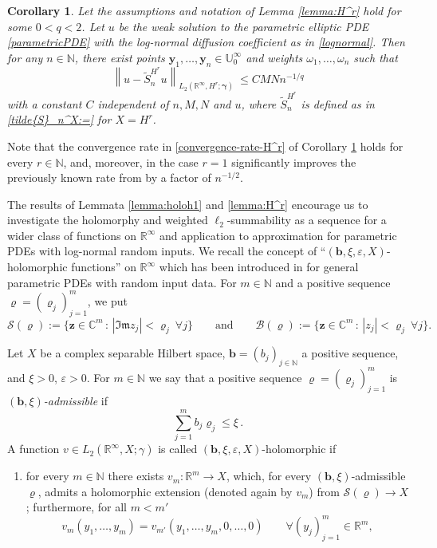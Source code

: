 \documentclass[11pt]{article}
\newtheorem{corollary}{Corollary}[section]
\numberwithin{equation}{section}
\theoremstyle{definition}
\theoremstyle{remark}
\newcommand{\set}[2]{\{#1\,:\,#2\}}
\newcommand{\norm}[2]{\left\|{#1}\right\|_{#2}}
\newcommand{\bb}{{\boldsymbol{b}}}
\newcommand{\by}{{\boldsymbol{y}}}
\newcommand{\bz}{{\boldsymbol{z}}}
\newcommand{\bgamma}{{\boldsymbol{\gamma}}}
\newcommand{\bvarrho}{{\boldsymbol{\varrho}}}
\def\RR{{\mathbb R}}
\def\NN{{\mathbb N}}
\def\CC{{\mathbb C}}
\def\CC{{\mathbb C}}
\def\NN{{\mathbb N}}
\def\RR{{\mathbb R}}
\def\Bb{{\mathcal B}}
\def\RRi{{\mathbb R}^\infty}
\def\UUi{{\mathbb U}^{\infty}}
\def\Bb{{\mathcal B}}
\def\Ss{{\mathcal S}}
\def\CC{{\mathbb C}}
\def\NN{{\mathbb N}}
\begin{document}
{\begin{corollary}\label{corollary:sampling-lognormal}
	Let the assumptions and notation of Lemma \ref{lemma:H^r} hold  for some
	$0 < q < 2$.  {Let  $u$ be the weak solution to the parametric elliptic PDE \eqref{parametricPDE}  with the log-normal diffusion coefficient as in \eqref{lognormal}.}
		Then for any $n \in \NN$, there exist points 
		$\by_1, \dots, \by_n \in \UUi_0$ and weights  $\omega_1, \dots, \omega_n$ such that 
	\begin{equation} \label{convergence-rate-H^r}
		\norm{u - \tilde{S}_n^{H^r} u}{L_2(\RRi,H^r;\bgamma)}
		\ \le C MN n^{-1/q}
	\end{equation}
	with a constant $C$ independent {of} $n,M,N$ and $u$,
	 where 
	$\tilde{S}_n^{H^r}$ is defined as in \eqref{tilde{S}_n^X:=} for $X= H^r$.
	\end{corollary}
    Note that the convergence rate in \eqref{convergence-rate-H^r} of Corollary \ref{corollary:sampling-lognormal} holds for every $r\in \NN$, and, moreover, in the case $r=1$ significantly improves the previously known rate from \cite[Corollary~5.9]{Dung21} by a factor of $n^{-1/2}$.
	
The results of Lemmata \ref{lemma:holoh1} and \ref{lemma:H^r} encourage us to investigate the holomorphy and weighted $\ell_2$-summability as a sequence for a wider class of functions on $\RRi$ and application to approximation for parametric PDEs with log-normal random inputs.
We recall the concept of ``$(\bb,\xi,\varepsilon,X)$-holomorphic
functions'' on $\RRi$ which has been introduced {in \cite[Definition 4.1]{DNSZ2023}} for general parametric PDEs with random input data. 
For $m\in\NN$ and a positive sequence $\bvarrho=(\varrho_j)_{j=1}^m$, we put
\begin{equation*}
	\label{eq:Sjrho}
	\Ss(\bvarrho) := \set{\bz\in \CC^m}{|\mathfrak{Im}z_j| < \varrho_j~\forall j}\qquad\text{and}\qquad
	\Bb(\bvarrho) := \set{\bz\in\CC^m}{|z_j|<\varrho_j~\forall j}.
\end{equation*}

Let $X$ be a complex separable Hilbert space,
$\bb=(b_j)_{j\in\NN}$ a positive sequence, and $\xi>0$, $\varepsilon>0$.
For $m\in\NN$ we say that a positive sequence $\bvarrho=(\varrho_j)_{j=1}^m$ is
\emph{$(\bb,\xi)$-admissible} if
\begin{equation*}\label{eq:adm}
	\sum_{j=1}^m b_j\varrho_j\leq \xi\,.
\end{equation*}
A function $v\in L_2(\RRi,X;\gamma)$ is called
$(\bb,\xi,\varepsilon,X)$-holomorphic if
\begin{enumerate}
	\item[{\rm (i)}]\label{item:hol} for every $m\in\NN$ there exists
	$v_m:\RR^m\to X$, which, for every $(\bb,\xi)$-admissible
	$\bvarrho$, admits a holomorphic extension
	(denoted again by $v_m$) from $\Ss(\bvarrho)\to X$; furthermore,
	for all $m<m'$
	\begin{equation*}\label{eq:un=um}
		v_m(y_1,\dots,y_m)=v_{m'}(y_1,\dots,y_m,0,\dots,0)\qquad\forall (y_j)_{j=1}^m\in\RR^m,
	\end{equation*}
	

\end{enumerate}}
\end{document}
